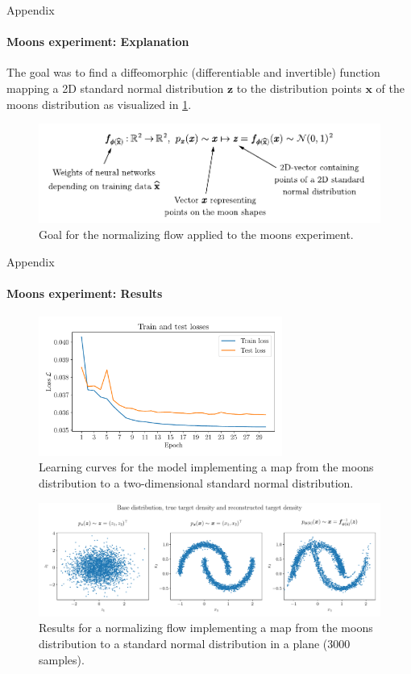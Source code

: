 \documentclass{beamer}
\newcommand\vect[1]{\ensuremath{\bm{#1}}}
\begin{document}
\begin{frame}[allowframebreaks]{Appendix}
	\framesubtitle{Moons experiment: Explanation}
	The goal was to find a diffeomorphic (differentiable and invertible) function mapping a 2D standard normal distribution $\vect{z}$ to the distribution points $\vect{x}$ of the moons distribution as visualized in \cref{fig:moonsgoal}.
	\begin{figure}[h]
		\centering
		\includegraphics[width=\textwidth]{figures/presentation/moons.pdf}
		\caption{Goal for the normalizing flow applied to the moons experiment.}
		\label{fig:moonsgoal}
	\end{figure}
\end{frame}

\begin{frame}[allowframebreaks]{Appendix}
	\framesubtitle{Moons experiment: Results}
	\begin{figure}[h!]
		\centering
		\includegraphics[width=8cm]{figures/thesis/nf-moons-example-loss}
		\caption{Learning curves for the model implementing a map from the moons distribution to a two-dimensional standard normal distribution.}
		\label{fig:nf-moons-example-loss}
	\end{figure}
	
	\begin{figure}[h!]
		\centering
		\includegraphics[width=\textwidth]{figures/thesis/nf-moons-example-plots.pdf}
		\caption{Results for a normalizing flow implementing a map from the moons distribution to a standard normal distribution in a plane (3000 samples).}
		\label{fig:nf-moons-example-plots}
	\end{figure}
\end{frame}
\end{document}
